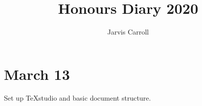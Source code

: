 \documentclass[]{article}
\title{Honours Diary 2020}
\author{Jarvis Carroll}
\begin{document}
\maketitle

\section{March 13}

Set up TeXstudio and basic document structure.
\end{document}

